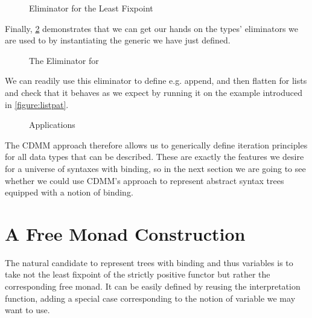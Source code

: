 \begin{figure}[h]
\caption{Eliminator for the Least Fixpoint}\label{figure:datafold}
\end{figure}

Finally, \cref{fig:listfold} demonstrates that we can get our hands
on the types' eliminators we are used to by instantiating the generic
 we have just defined.

\begin{figure}
  \caption{The Eliminator for \label{fig:listfold}}
\end{figure}

We can readily use this eliminator to define e.g. append, and then
flatten for lists and check that it behaves as we expect by running
it on the example introduced in \cref{figure:listpat}.

\begin{figure}[h]
\begin{minipage}{0.5\textwidth}
  \end{minipage}\begin{minipage}{0.5\textwidth}
  \end{minipage}
\caption{Applications\label{fig:appendflatten}}
\end{figure}

The CDMM approach therefore allows us to generically define iteration
principles for all data types that can be described. These are exactly
the features we desire for a universe of syntaxes with binding, so in
the next section we are going to see whether we could use CDMM's approach
to represent abstract syntax trees equipped with a notion of binding.

\section{A Free Monad Construction}

The natural candidate to represent trees with binding and thus variables
is to take not the least fixpoint of the strictly positive functor but
rather the corresponding free monad. It can be easily defined by reusing
the interpretation function, adding a special case corresponding to the
notion of variable we may want to use.

